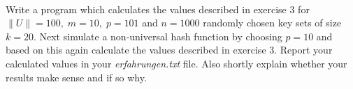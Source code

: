  \\
Write a program which calculates the values described in exercise 3 for
$\|U\| = 100, \; m = 10, \; p = 101$ and $n = 1000$ randomly chosen key sets
of size $k = 20$.
Next simulate a non-universal hash function by choosing $p = 10$ and based on
this again calculate the values described in exercise 3.
Report your calculated values in your \textit{erfahrungen.txt} file. Also shortly 
explain whether your results make sense and if so why.
